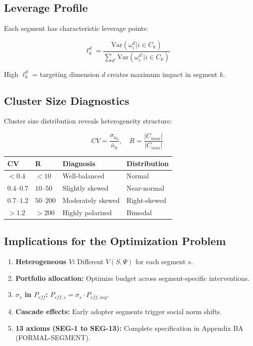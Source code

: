 \subsection{Leverage Profile}

Each segment has characteristic leverage points:

\begin{equation}
\boxed{
\ell_k^d = \frac{\text{Var}(\omega_i^d | i \in C_k)}{\sum_{d'} \text{Var}(\omega_i^{d'} | i \in C_k)}
}
\label{eq:mp-leverage}
\end{equation}

High $\ell_k^d$ = targeting dimension $d$ creates maximum impact in segment $k$.

\subsection{Cluster Size Diagnostics}

Cluster size distribution reveals heterogeneity structure:

\begin{equation}
CV = \frac{\sigma_{n_k}}{\bar{n}_k}, \quad R = \frac{|C_{max}|}{|C_{min}|}
\label{eq:mp-cluster-diagnostics}
\end{equation}

\begin{center}
\renewcommand{\arraystretch}{1.2}
\small
\begin{tabular}{@{}llll@{}}
\toprule
\textbf{CV} & \textbf{R} & \textbf{Diagnosis} & \textbf{Distribution} \\
\midrule
$< 0.4$ & $< 10$ & Well-balanced & Normal \\
$0.4$--$0.7$ & $10$--$50$ & Slightly skewed & Near-normal \\
$0.7$--$1.2$ & $50$--$200$ & Moderately skewed & Right-skewed \\
$> 1.2$ & $> 200$ & Highly polarized & Bimodal \\
\bottomrule
\end{tabular}
\end{center}

\subsection{Implications for the Optimization Problem}

\begin{enumerate}[nosep]
\item \textbf{Heterogeneous $V$:} Different $V(S, \Psi)$ for each segment $s$.
\item \textbf{Portfolio allocation:} Optimize budget across segment-specific interventions.
\item \textbf{$\sigma_s$ in $P_{eff}$:} $P_{eff,s} = \sigma_s \cdot P_{eff,avg}$.
\item \textbf{Cascade effects:} Early adopter segments trigger social norm shifts.
\item \textbf{13 axioms (SEG-1 to SEG-13):} Complete specification in Appendix BA (FORMAL-SEGMENT).
\end{enumerate}

